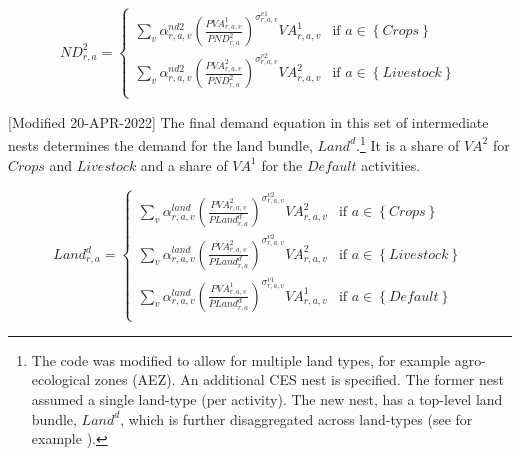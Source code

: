 \documentclass[11pt,letterpaper]{report}
\begin{document}
\begin{equation}
\label{eq:nd2}
\mathit{ND}^2_{r,a} =
\begin{cases}
   \displaystyle \sum_v{
         \alpha^{\mathit{nd2}}_{r,a,v}
         \left( \frac {\mathit{PVA}^1_{r,a,v}} {\mathit{PND}^2_{r,a}}
         \right)^{\sigma^{v1}_{r,a,v}}
         \mathit{VA}^1_{r,a,v}
      }
   & \textrm{if } a \in \left\{ \mathit{Crops} \right\} \\
   \displaystyle \sum_v{
         \alpha^{\mathit{nd2}}_{r,a,v}
         \left( \frac {\mathit{PVA}^2_{r,a,v}} {\mathit{PND}^2_{r,a}}
         \right)^{\sigma^{v2}_{r,a,v}}
         \mathit{VA}^2_{r,a,v}
      }
   & \textrm{if } a \in \left\{ \mathit{Livestock} \right\} \\
\end{cases}
\end{equation}

[Modified 20-APR-2022]
The final demand equation in this set of intermediate nests determines the
demand for the land bundle, $\mathit{Land}^{d}$.\footnote{The code was modified
to allow for multiple land types, for example agro-ecological zones (AEZ). An
additional CES nest is specified. The former nest assumed
a single land-type (per activity). The new nest, has a top-level
land bundle, $\mathit{Land}^{d}$, which is further disaggregated across land-types (see
for example \cite{HerteletalChap62009}).} It is a share of
$\mathit{VA}^2$ for $\mathit{Crops}$ and $\mathit{Livestock}$ and a share of
$\mathit{VA}^1$ for the $\mathit{Default}$ activities.

\begin{equation}
\label{eq:landd}
\mathit{Land}^d_{r,a} =
\begin{cases}
   \displaystyle \sum_v {
         \alpha^{\mathit{land}}_{r,a,v}
         \left( \frac {\mathit{PVA}^2_{r,a,v}}
            {\mathit{PLand}^d_{r,a}}
         \right)^{\sigma^{v2}_{r,a,v}}
          {\mathit{VA}^2_{r,a,v}}}
   & \textrm{if } a \in \left\{ \mathit{Crops} \right\} \\
   \displaystyle \sum_v {
         \alpha^{\mathit{land}}_{r,a,v}
         \left( \frac {\mathit{PVA}^2_{r,a,v}}
            {\mathit{PLand}^d_{r,a}} \right)^{\sigma^{v2}_{r,a,v}}
          {\mathit{VA}^2_{r,a,v}}}
   & \textrm{if } a \in \left\{ \mathit{Livestock} \right\} \\
   \displaystyle \sum_v {
         \alpha^{\mathit{land}}_{r,a,v}
         \left( \frac {\mathit{PVA}^1_{r,a,v}}
            {\mathit{PLand}^d_{r,a}}
         \right)^{\sigma^{v1}_{r,a,v}}
         {\mathit{VA}^1_{r,a,v}}}
   & \textrm{if } a \in \left\{ \mathit{Default} \right\} \\
\end{cases}
\end{equation}
\end{document}
